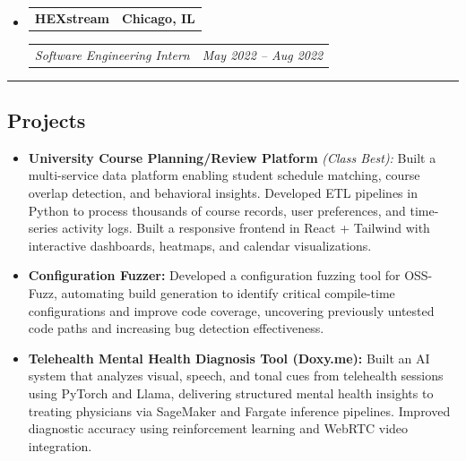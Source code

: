 \documentclass[11pt,letterpaper]{article}
\makeatletter
\newcommand{\headerrow}[2]
{\begin{tabular*}{\linewidth}{l@{\extracolsep{\fill}}r}
#1 &
#2 \\
\end{tabular*}}
\makeatother
\begin{document}
\begin{itemize}[leftmargin=1em]
	\item
	      \headerrow
	      {\textbf{HEXstream}}
	      {\textbf{Chicago, IL}}
	      \headerrow
	      {\emph{Software Engineering Intern}}
	      {\emph{May 2022 -- Aug 2022}}
\end{itemize}
\hrule
{}

\vspace{-1em}
\subsection*{\Large Projects}
\begin{itemize}[leftmargin=1em,noitemsep]
\item \textbf{University Course Planning/Review Platform} \emph{(Class Best):} Built a multi-service data platform enabling student schedule matching, course overlap detection, and behavioral insights. Developed ETL pipelines in Python to process thousands of course records, user preferences, and time-series activity logs. Built a responsive frontend in React + Tailwind with interactive dashboards, heatmaps, and calendar visualizations.
\item \textbf{Configuration Fuzzer:} Developed a configuration fuzzing tool for OSS-Fuzz, automating build generation to identify critical compile-time configurations and improve code coverage, uncovering previously untested code paths and increasing bug detection effectiveness.
\item \textbf{Telehealth Mental Health Diagnosis Tool (Doxy.me):} Built an AI system that analyzes visual, speech, and tonal cues from telehealth sessions using PyTorch and Llama, delivering structured mental health insights to treating physicians via SageMaker and Fargate inference pipelines. Improved diagnostic accuracy using reinforcement learning and WebRTC video integration.
\end{itemize}
\end{document}
